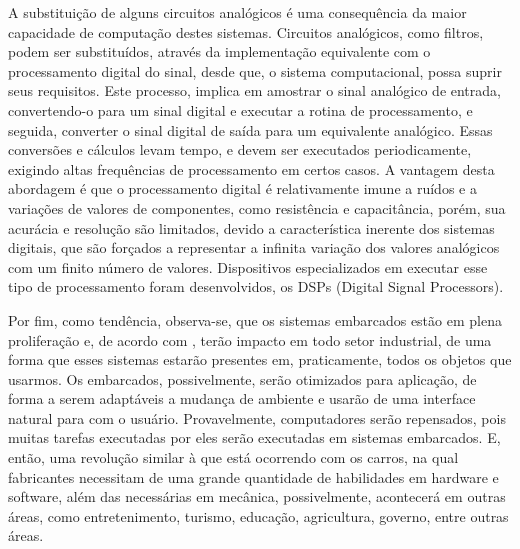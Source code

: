 A substituição de alguns circuitos analógicos é uma consequência da maior capacidade de computação destes sistemas. Circuitos analógicos, como filtros, podem ser substituídos, através da implementação equivalente com o processamento digital do sinal, desde que, o sistema computacional, possa suprir seus requisitos. Este processo, implica em amostrar o sinal analógico de entrada, convertendo-o para um sinal digital e executar a rotina de processamento, e seguida, converter o sinal digital de saída para um equivalente analógico. Essas conversões e cálculos levam tempo, e devem ser executados periodicamente, exigindo altas frequências de processamento em certos casos. A vantagem desta abordagem é que o processamento digital é relativamente imune a ruídos e a variações de valores de componentes, como resistência e capacitância, porém, sua acurácia e resolução são limitados, devido a característica inerente dos sistemas digitais, que são forçados a representar a infinita variação dos valores analógicos com um finito número de valores. Dispositivos especializados em executar esse tipo de processamento foram desenvolvidos, os DSPs (Digital Signal Processors).

Por fim, como tendência, observa-se, que os sistemas embarcados estão em plena proliferação e, de acordo com , terão impacto em todo setor industrial, de uma forma que esses sistemas estarão presentes em, praticamente, todos os objetos que usarmos. Os embarcados, possivelmente, serão otimizados para aplicação, de forma a serem adaptáveis a mudança de ambiente e usarão de uma interface natural para com o usuário. Provavelmente, computadores serão repensados, pois muitas tarefas executadas por eles serão executadas em sistemas embarcados. E, então, uma revolução similar à que está ocorrendo com os carros, na qual fabricantes necessitam de uma grande quantidade de habilidades em hardware e software, além das necessárias em mecânica, possivelmente, acontecerá em outras áreas, como entretenimento, turismo, educação, agricultura, governo, entre outras áreas. 


